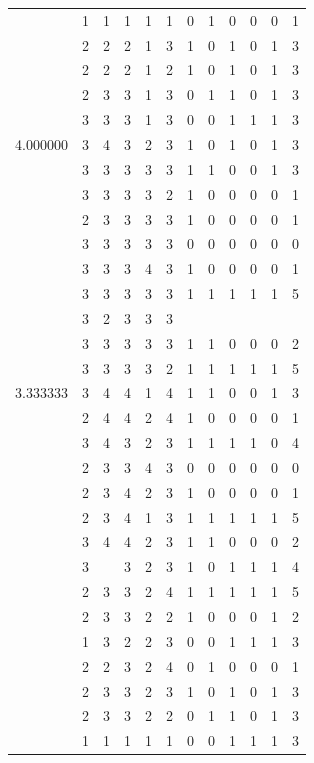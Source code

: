 \documentclass[]{book}
\theoremstyle{definition}
\theoremstyle{definition}
\theoremstyle{definition}
\theoremstyle{remark}
\begin{document}
\begin{table}
{\begin{tabular}[t]{rrrrrrrrrrrr}
 & 1 & 1 & 1 & 1 & 1 & 0 & 1 & 0 & 0 & 0 & 1\\
 & 2 & 2 & 2 & 1 & 3 & 1 & 0 & 1 & 0 & 1 & 3\\
 & 2 & 2 & 2 & 1 & 2 & 1 & 0 & 1 & 0 & 1 & 3\\
 & 2 & 3 & 3 & 1 & 3 & 0 & 1 & 1 & 0 & 1 & 3\\
 & 3 & 3 & 3 & 1 & 3 & 0 & 0 & 1 & 1 & 1 & 3\\
4.000000 & 3 & 4 & 3 & 2 & 3 & 1 & 0 & 1 & 0 & 1 & 3\\
 & 3 & 3 & 3 & 3 & 3 & 1 & 1 & 0 & 0 & 1 & 3\\
 & 3 & 3 & 3 & 3 & 2 & 1 & 0 & 0 & 0 & 0 & 1\\
 & 2 & 3 & 3 & 3 & 3 & 1 & 0 & 0 & 0 & 0 & 1\\
 & 3 & 3 & 3 & 3 & 3 & 0 & 0 & 0 & 0 & 0 & 0\\
 & 3 & 3 & 3 & 4 & 3 & 1 & 0 & 0 & 0 & 0 & 1\\
 & 3 & 3 & 3 & 3 & 3 & 1 & 1 & 1 & 1 & 1 & 5\\
 & 3 & 2 & 3 & 3 & 3 &  &  &  &  &  & \\
 & 3 & 3 & 3 & 3 & 3 & 1 & 1 & 0 & 0 & 0 & 2\\
 & 3 & 3 & 3 & 3 & 2 & 1 & 1 & 1 & 1 & 1 & 5\\
3.333333 & 3 & 4 & 4 & 1 & 4 & 1 & 1 & 0 & 0 & 1 & 3\\
 & 2 & 4 & 4 & 2 & 4 & 1 & 0 & 0 & 0 & 0 & 1\\
 & 3 & 4 & 3 & 2 & 3 & 1 & 1 & 1 & 1 & 0 & 4\\
 & 2 & 3 & 3 & 4 & 3 & 0 & 0 & 0 & 0 & 0 & 0\\
 & 2 & 3 & 4 & 2 & 3 & 1 & 0 & 0 & 0 & 0 & 1\\
 & 2 & 3 & 4 & 1 & 3 & 1 & 1 & 1 & 1 & 1 & 5\\
 & 3 & 4 & 4 & 2 & 3 & 1 & 1 & 0 & 0 & 0 & 2\\
 & 3 &  & 3 & 2 & 3 & 1 & 0 & 1 & 1 & 1 & 4\\
 & 2 & 3 & 3 & 2 & 4 & 1 & 1 & 1 & 1 & 1 & 5\\
 & 2 & 3 & 3 & 2 & 2 & 1 & 0 & 0 & 0 & 1 & 2\\
 & 1 & 3 & 2 & 2 & 3 & 0 & 0 & 1 & 1 & 1 & 3\\
 & 2 & 2 & 3 & 2 & 4 & 0 & 1 & 0 & 0 & 0 & 1\\
 & 2 & 3 & 3 & 2 & 3 & 1 & 0 & 1 & 0 & 1 & 3\\
 & 2 & 3 & 3 & 2 & 2 & 0 & 1 & 1 & 0 & 1 & 3\\
 & 1 & 1 & 1 & 1 & 1 & 0 & 0 & 1 & 1 & 1 & 3\\

\end{tabular}}
\end{table}
\end{document}

